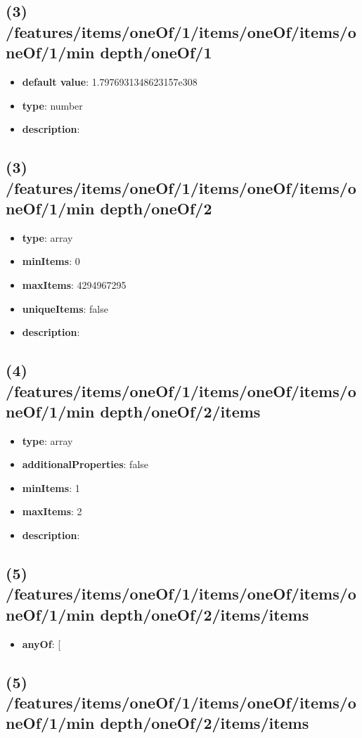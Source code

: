 \subsection{(3) /features/items/oneOf/1/items/oneOf/items/oneOf/1/min depth/oneOf/1}
\begin{itemize}[leftmargin=3em]\item {\bf default value}: 1.7976931348623157e308
\item {\bf type}: number
\item {\bf description}: 
\end{itemize}\subsection{(3) /features/items/oneOf/1/items/oneOf/items/oneOf/1/min depth/oneOf/2}
\begin{itemize}[leftmargin=3em]\item {\bf type}: array
\item {\bf minItems}: 0
\item {\bf maxItems}: 4294967295
\item {\bf uniqueItems}: false
\item {\bf description}: 
\end{itemize}\subsection{(4) /features/items/oneOf/1/items/oneOf/items/oneOf/1/min depth/oneOf/2/items}
\begin{itemize}[leftmargin=4em]\item {\bf type}: array
\item {\bf additionalProperties}: false
\item {\bf minItems}: 1
\item {\bf maxItems}: 2
\item {\bf description}: 
\end{itemize}\subsection{(5) /features/items/oneOf/1/items/oneOf/items/oneOf/1/min depth/oneOf/2/items/items}
\begin{itemize}[leftmargin=5em]\item {\bf anyOf}: [\end{itemize}\subsection{(5) /features/items/oneOf/1/items/oneOf/items/oneOf/1/min depth/oneOf/2/items/items}
